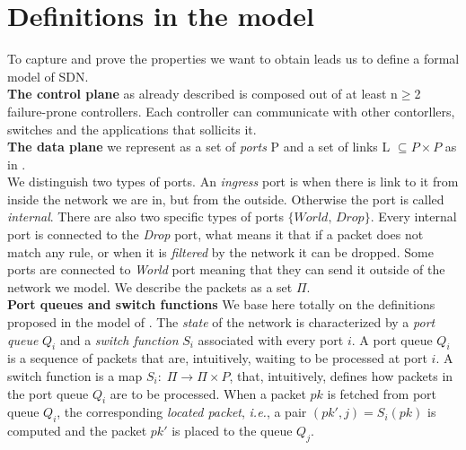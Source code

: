 \documentclass{article}
\begin{document}
\section{Definitions in the model}
To capture and prove the properties we want to obtain leads us to define a formal model of SDN. \\
% 
\textbf{The control plane} as already described is composed out of at least n$\geq$2 failure-prone controllers. Each controller can communicate with other contorllers, switches and the applications that sollicits it. \\
\textbf{The data plane} we represent as a set of \emph{ports} P and a set of links L $\subseteq P\times P$ as in \cite{Reitblatt:2012:ANU:2342356.2342427}. \\
We distinguish two types of ports. An \emph{ingress} port is when there is link to it from inside the network we are in, but from the outside. Otherwise the port is called \emph{internal}. There are also two specific types of ports $\lbrace \textit{World, Drop}\rbrace$. Every internal port is connected to the \emph{Drop} port, what means it that if a packet does not match any rule, or when it is \emph{filtered} by the network it can be dropped. Some ports are connected to \emph{World} port meaning that they can send it outside of the network we model. We describe the packets as a set $\Pi$.\\
\textbf{Port queues and switch functions} We base here totally on the definitions proposed in the model of \cite{CKLS15}.
The \emph{state} of the network is characterized by a \emph{port
  queue} $Q_i$ and a \emph{switch function} $S_i$ associated with
every port $i$.
A port queue $Q_i$ is a sequence of packets that are, intuitively, waiting to be processed at port $i$.
A switch function is a map $S_i:\;\Pi\rightarrow \Pi\times P$,
that, intuitively, defines how packets in
the port queue $Q_i$ are to be processed.
When a packet $\textit{pk}$ is fetched from port queue $Q_i$, the corresponding \emph{located
  packet}, \emph{i.e.}, a pair $(\textit{pk}',j)=S_i(\textit{pk})$ is computed and the packet $\textit{pk}'$ is placed to the queue $Q_j$.
\end{document}
